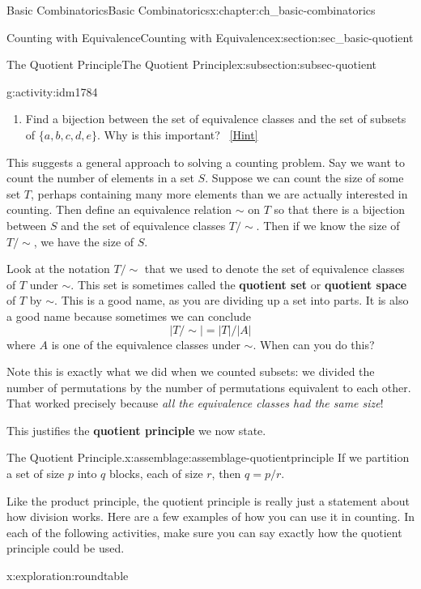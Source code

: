 \documentclass[oneside,10pt,]{book}
\newcommand{\terminology}[1]{\textbf{#1}}
\numberwithin{equation}{chapter}
\begin{document}
\begin{chapterptx}{Basic Combinatorics}{}{Basic Combinatorics}{}{}{x:chapter:ch_basic-combinatorics}
\begin{sectionptx}{Counting with Equivalence}{}{Counting with Equivalence}{}{}{x:section:sec_basic-quotient}
\begin{subsectionptx}{The Quotient Principle}{}{The Quotient Principle}{}{}{x:subsection:subsec-quotient}
\begin{activity}{}{g:activity:idm1784}
\begin{enumerate}[font=\bfseries,label=(\alph*),ref=\alph*]
\item{}Find a bijection between the set of equivalence classes and the set of subsets of \(\{a,b,c,d,e\}\).  Why is this important?%
\qquad~\hfill{\tiny\hyperlink{g:hint:idm1812-back}{[Hint]}}\end{enumerate}
\end{activity}
This suggests a general approach to solving a counting problem.  Say we want to count the number of elements in a set \(S\).  Suppose we can count the size of some set \(T\), perhaps containing many more elements than we are actually interested in counting.  Then define an equivalence relation \(\sim\) on \(T\) so that there is a bijection between \(S\) and the set of equivalence classes \(T/\sim\).  Then if we know the size of \(T/\sim\), we have the size of \(S\).%
\par
Look at the notation \(T/\sim\) that we used to denote the set of equivalence classes of \(T\) under \(\sim\).  This set is sometimes called the \terminology{quotient set} or \terminology{quotient space} of \(T\) by \(\sim\).  This is a good name, as you are dividing up a set into parts.  It is also a good name because sometimes we can conclude%
\begin{equation*}
|T/\sim| = |T|/|A|
\end{equation*}
where \(A\) is one of the equivalence classes under \(\sim\).  When can you do this?%
\par
Note this is exactly what we did when we counted subsets: we divided the number of permutations by the number of permutations equivalent to each other.  That worked precisely because \emph{all the equivalence classes had the same size}!%
\par
This justifies the \terminology{quotient principle} we now state.%
\begin{assemblage}{The Quotient Principle.}{x:assemblage:assemblage-quotientprinciple}%
If we partition a set of size \(p\) into \(q\) blocks, each of size \(r\), then \(q = p/r\).%
\end{assemblage}
Like the product principle, the quotient principle is really just a statement about how division works.  Here are a few examples of how you can use it in counting.  In each of the following activities, make sure you can say exactly how the quotient principle could be used.%
\begin{exploration}{}{x:exploration:roundtable}%

\end{exploration}
\end{subsectionptx}
\end{sectionptx}
\end{chapterptx}
\end{document}
